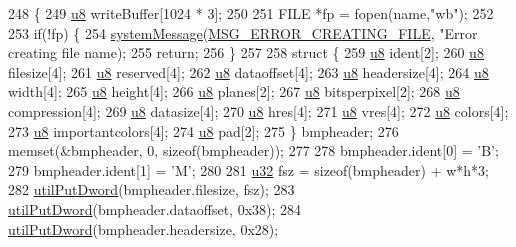 \begin{DoxyCode}
248 \{
249   \mbox{\hyperlink{_system_8h_aed742c436da53c1080638ce6ef7d13de}{u8}} writeBuffer[1024 * 3];
250   
251   FILE *fp = fopen(name,\textcolor{stringliteral}{"wb"});
252 
253   \textcolor{keywordflow}{if}(!fp) \{
254     \mbox{\hyperlink{system_8cpp_a747a9cb8e015a3d45cca636b5bd0fc69}{systemMessage}}(\mbox{\hyperlink{_n_l_s_8h_a165f1f2539e202f0a24e6e9583c63475}{MSG\_ERROR\_CREATING\_FILE}}, \textcolor{stringliteral}{"Error creating file %
      name);
255     \textcolor{keywordflow}{return};
256   \}
257 
258   \textcolor{keyword}{struct }\{
259     \mbox{\hyperlink{_system_8h_aed742c436da53c1080638ce6ef7d13de}{u8}} ident[2];
260     \mbox{\hyperlink{_system_8h_aed742c436da53c1080638ce6ef7d13de}{u8}} filesize[4];
261     \mbox{\hyperlink{_system_8h_aed742c436da53c1080638ce6ef7d13de}{u8}} reserved[4];
262     \mbox{\hyperlink{_system_8h_aed742c436da53c1080638ce6ef7d13de}{u8}} dataoffset[4];
263     \mbox{\hyperlink{_system_8h_aed742c436da53c1080638ce6ef7d13de}{u8}} headersize[4];
264     \mbox{\hyperlink{_system_8h_aed742c436da53c1080638ce6ef7d13de}{u8}} width[4];
265     \mbox{\hyperlink{_system_8h_aed742c436da53c1080638ce6ef7d13de}{u8}} height[4];
266     \mbox{\hyperlink{_system_8h_aed742c436da53c1080638ce6ef7d13de}{u8}} planes[2];
267     \mbox{\hyperlink{_system_8h_aed742c436da53c1080638ce6ef7d13de}{u8}} bitsperpixel[2];
268     \mbox{\hyperlink{_system_8h_aed742c436da53c1080638ce6ef7d13de}{u8}} compression[4];
269     \mbox{\hyperlink{_system_8h_aed742c436da53c1080638ce6ef7d13de}{u8}} datasize[4];
270     \mbox{\hyperlink{_system_8h_aed742c436da53c1080638ce6ef7d13de}{u8}} hres[4];
271     \mbox{\hyperlink{_system_8h_aed742c436da53c1080638ce6ef7d13de}{u8}} vres[4];
272     \mbox{\hyperlink{_system_8h_aed742c436da53c1080638ce6ef7d13de}{u8}} colors[4];
273     \mbox{\hyperlink{_system_8h_aed742c436da53c1080638ce6ef7d13de}{u8}} importantcolors[4];
274     \mbox{\hyperlink{_system_8h_aed742c436da53c1080638ce6ef7d13de}{u8}} pad[2];
275   \} bmpheader;
276   memset(&bmpheader, 0, \textcolor{keyword}{sizeof}(bmpheader));
277 
278   bmpheader.ident[0] = \textcolor{charliteral}{'B'};
279   bmpheader.ident[1] = \textcolor{charliteral}{'M'};
280 
281   \mbox{\hyperlink{_system_8h_a10e94b422ef0c20dcdec20d31a1f5049}{u32}} fsz = \textcolor{keyword}{sizeof}(bmpheader) + w*h*3;
282   \mbox{\hyperlink{_util_8cpp_a61ef2cbdb9d8b5c50004ebd1557439c7}{utilPutDword}}(bmpheader.filesize, fsz);
283   \mbox{\hyperlink{_util_8cpp_a61ef2cbdb9d8b5c50004ebd1557439c7}{utilPutDword}}(bmpheader.dataoffset, 0x38);
284   \mbox{\hyperlink{_util_8cpp_a61ef2cbdb9d8b5c50004ebd1557439c7}{utilPutDword}}(bmpheader.headersize, 0x28);
}
\end{DoxyCode}
